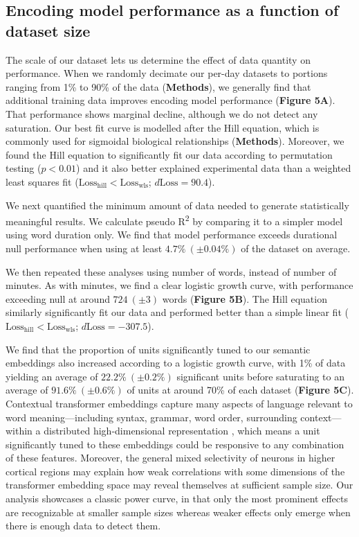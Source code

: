 \documentclass[pdflatex,sn-basic]{sn-jnl}%
\theoremstyle{thmstyleone}%
\theoremstyle{thmstyletwo}%
\theoremstyle{thmstylethree}%
\begin{document}
\clearpage
\subsection{Encoding model performance as a function of dataset size}

The scale of our dataset lets us determine the effect of data quantity on performance. When we randomly decimate our per-day datasets to portions ranging from 1\% to 90\% of the data (\textbf{Methods}), we generally find that additional training data improves encoding model performance (\textbf{Figure 5A}). That performance shows marginal decline, although we do not detect any saturation. Our best fit curve is modelled after the Hill equation, which is commonly used for sigmoidal biological relationships (\textbf{Methods}). Moreover, we found the Hill equation to significantly fit our data according to permutation testing ($p<0.01$) and it also better explained experimental data than a weighted least squares fit ($\mathrm{Loss}_{\mathrm{hill}} < \mathrm{Loss}_{\mathrm{wls}}$; $d\mathrm{Loss} = 90.4$).

We next quantified the minimum amount of data needed to generate statistically meaningful results. We calculate pseudo R\textsuperscript{{2}} by comparing it to a simpler model using word duration only. We find that model performance exceeds durational null performance when using at least $4.7\%~(\pm 0.04\%)$ of the dataset on average.

We then repeated these analyses using number of words, instead of number of minutes. As with minutes, we find a clear logistic growth curve, with performance exceeding null at around $724~(\pm 3)$ words (\textbf{Figure 5B}). The Hill equation similarly significantly fit our data and performed better than a simple linear fit ($\mathrm{Loss}_{\mathrm{hill}} < \mathrm{Loss}_{\mathrm{wls}}$; $d\mathrm{Loss} = -307.5$).

We find that the proportion of units significantly tuned to our semantic embeddings also increased according to a logistic growth curve, with 1\% of data yielding an average of $22.2\%~(\pm 0.2\%)$ significant units before saturating to an average of $91.6\%~(\pm 0.6\%)$ of units at around 70\% of each dataset (\textbf{Figure 5C}). Contextual transformer embeddings capture many aspects of language relevant to word meaning---including syntax, grammar, word order, surrounding context---within a distributed high-dimensional representation \citep{bib66}, which means a unit significantly tuned to these embeddings could be responsive to any combination of these features. Moreover, the general mixed selectivity of neurons in higher cortical regions \citep{bib67} may explain how weak correlations with some dimensions of the transformer embedding space may reveal themselves at sufficient sample size. Our analysis showcases a classic power curve, in that only the most prominent effects are recognizable at smaller sample sizes whereas weaker effects only emerge when there is enough data to detect them.
\end{document}
